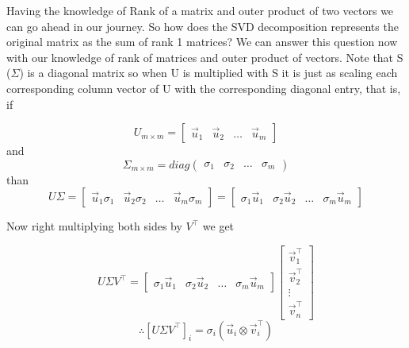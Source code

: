 \documentclass{article}
\begin{document}
\begin{center}
\end{center}

Having the knowledge of Rank of a matrix and outer product of two vectors we can go ahead in our journey. So how does the SVD decomposition represents the original matrix as the sum of rank 1 matrices? We can answer this question now with our knowledge of rank of matrices and outer product of vectors. Note that S ($\Sigma$) is a diagonal matrix so when U is multiplied with S it is just as scaling each corresponding column vector of U with the corresponding diagonal entry, that is, if 

$$
U_{m \times m} = \begin{bmatrix}
    \vec{u}_{1} & \vec{u}_{2} & \dots &\vec{u}_{m}
\end{bmatrix}
$$ and
$$
\Sigma_{m \times m} = diag(\begin{matrix}
    \sigma_{1} & \sigma_{2} & \dots & \sigma_{m}
\end{matrix})
$$ than
$$
U\Sigma = \begin{bmatrix}
    \vec{u}_{1}\sigma_{1} & \vec{u}_{2}\sigma_{2} & \dots & \vec{u}_{m}\sigma_{m}
\end{bmatrix}
= \begin{bmatrix}
    \sigma_{1} \vec{u}_{1} & \sigma_{2} \vec{u}_{2} & \dots & \sigma_{m} \vec{u}_{m}
\end{bmatrix}
$$

Now right multiplying both sides by $V^{\top}$ we get

$$
U\Sigma V^{\top} = \begin{bmatrix} \sigma_{1} \vec{u}_{1} & \sigma_{2} \vec{u}_{2} & \dots & \sigma_{m} \vec{u}_{m} \end{bmatrix}
\begin{bmatrix}
    \vec{v}_{1}^{\top} \\
    \vec{v}_{2}^{\top} \\
    \vdots \\
    \vec{v}_{n}^{\top}
\end{bmatrix}
$$
$$
\therefore [U\Sigma V^{\top}]_{i} = \sigma_{i} (\vec{u}_{i} \otimes \vec{v}^{\top}_{i})
$$
\end{document}
